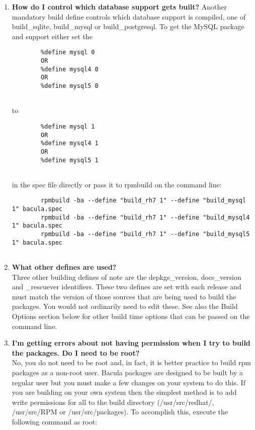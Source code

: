 \begin{enumerate}
\item 
   \label{faq2}
   {\bf How do I control which database support gets built?}
   Another mandatory build define controls which database support is compiled,
   one of  build\_sqlite, build\_mysql or build\_postgresql. To get the MySQL
   package and support either  set the  

\footnotesize
\begin{verbatim}
        %define mysql 0
        OR
        %define mysql4 0
        OR
        %define mysql5 0
        
\end{verbatim}
\normalsize

to  

\footnotesize
\begin{verbatim}
        %define mysql 1
        OR
        %define mysql4 1
        OR
        %define mysql5 1
        
\end{verbatim}
\normalsize

in the spec file directly or pass it to rpmbuild on the command line:  

\footnotesize
\begin{verbatim}
        rpmbuild -ba --define "build_rh7 1" --define "build_mysql 1" bacula.spec
        rpmbuild -ba --define "build_rh7 1" --define "build_mysql4 1" bacula.spec
        rpmbuild -ba --define "build_rh7 1" --define "build_mysql5 1" bacula.spec
        
\end{verbatim}
\normalsize

\item 
   \label{faq3}
   {\bf What other defines are used?} \\
   Three other building defines of note are the depkgs\_version, docs\_version and
   \_rescuever identifiers. These  two defines are set with each release and must 
   match the version of those sources that are being used to build the packages. 
   You would not ordinarily need to edit these.  See also the Build Options section 
   below for other build time options that can be passed on the command line.
\item 
   \label{faq4}
   {\bf I'm getting errors about not having permission when I try  to build the
   packages. Do I need to be root?} \\
   No, you do not need to be root and, in fact, it is better practice to
   build rpm packages as a non-root user.  Bacula packages are designed to
   be built by a regular user but you must make a few changes on your
   system to do this.  If you are building on your own system then the
   simplest method is to add write permissions for all to the build
   directory (/usr/src/redhat/, /usr/src/RPM or /usr/src/packages).  
   To accomplish this, execute the following command as root:


\end{enumerate}
